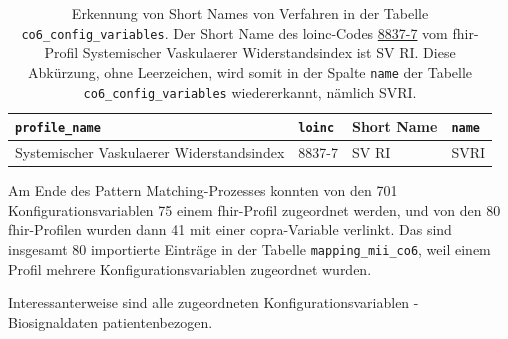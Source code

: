 \begin{table}[ht]
	\centering 
	\caption[Erkennung von \glqq Short Names\grqq{} von Verfahren in der Tabelle \\ co6\_config\_variables]{Erkennung von \glqq Short Names\grqq{} von Verfahren in der Tabelle \texttt{co6\_config\_variables}. Der \glqq Short Name\grqq{} des \ac{loinc}-Codes \href{https://loinc.org/8837-7/}{8837-7} vom \ac{fhir}-Profil \glqq Systemischer Vaskulaerer Widerstandsindex\grqq{} ist \glqq SV RI\grqq{}. Diese Abkürzung, ohne Leerzeichen, wird somit in der Spalte \texttt{name} der Tabelle \texttt{co6\_config\_variables} wiedererkannt, nämlich SVRI.}
	\label{tab:shortnamepattern}
	\begin{tabular}{|p{4cm}|l|l|l|}
		\hline
		\bfseries \texttt{profile\_name} & \texttt{loinc} & \bfseries Short Name &  \texttt{\textbf{name}} \\ \hline
		Systemischer Vaskulaerer Widerstandsindex & 8837-7 & SV RI & SVRI \\ \hline 
	\end{tabular}
\end{table}

Am Ende des Pattern Matching-Prozesses konnten von den 701 Konfigurationsvariablen 75 einem \ac{fhir}-Profil zugeordnet werden, und von den 80 \ac{fhir}-Profilen wurden dann 41 mit einer \ac{copra}-Variable verlinkt. Das sind insgesamt 80 importierte Einträge in der Tabelle \texttt{mapping\_mii\_co6}, weil einem Profil mehrere Konfigurationsvariablen zugeordnet wurden. 

Interessanterweise sind alle zugeordneten Konfigurationsvariablen - Biosignaldaten patientenbezogen. 